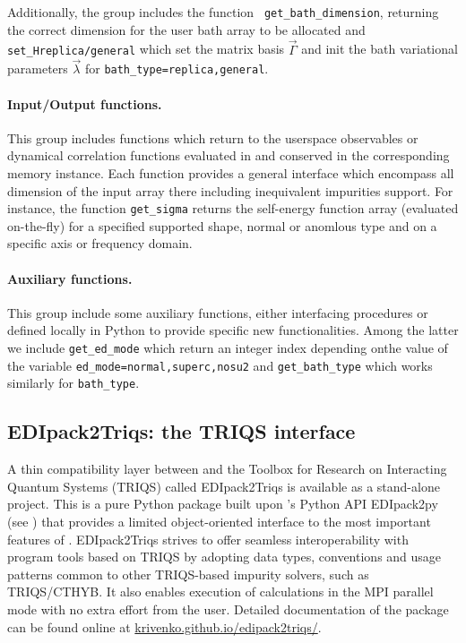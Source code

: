 \documentclass[edipack_sp.tex]{subfiles}
\begin{document}
Additionally, the group includes the function {\tt
  get\_bath\_dimension}, returning the correct
dimension for the user bath array to be allocated and {\tt
  set\_H{replica/general}} which set the matrix basis
$\vec{\Gamma}$ and init the bath variational parameters
$\vec{\lambda}$ for {\tt bath\_type=replica,general}. 




  
\paragraph{{\bf Input/Output functions}.}
This group includes functions which return to the userspace
observables or dynamical correlation functions evaluated in \NAME and
conserved in the corresponding memory instance. Each function
provides a general interface which encompass all dimension of the
input array there including inequivalent impurities support.
For instance, the function {\tt get\_sigma} returns the self-energy
function array (evaluated on-the-fly) for a specified supported shape,
normal or anomlous type and on a specific axis or frequency domain. 
    

\paragraph{{\bf Auxiliary functions}.}
This group include some auxiliary functions, either interfacing \NAME
procedures or defined locally in Python to provide specific new
functionalities. Among the latter we include {\tt get\_ed\_mode} which return an integer index depending onthe value of the variable {\tt ed\_mode=normal,superc,nosu2}
and {\tt get\_bath\_type} which works similarly for {\tt bath\_type}.









\subsection{EDIpack2Triqs: the TRIQS interface}\label{sSecInteropTRIQS}
A thin compatibility layer between \NAME and the Toolbox for Research on
Interacting Quantum Systems (TRIQS)\cite{Parcollet2015CPC} called EDIpack2Triqs
is available as a stand-alone project. This is a pure Python package
built upon \NAME's Python API EDIpack2py (see ) that provides a
limited object-oriented interface to the most important features of \NAME.
EDIpack2Triqs strives to offer seamless interoperability with program tools
based on TRIQS by adopting data types, conventions and usage patterns
common to other TRIQS-based impurity solvers, such as
TRIQS/CTHYB\cite{Seth2016CPC}. It also enables execution of \NAME calculations
in the MPI parallel mode with no extra effort from the user.
Detailed documentation of the package can be 
found online at \href{https://krivenko.github.io/edipack2triqs/}
{krivenko.github.io/edipack2triqs/}.
\end{document}
